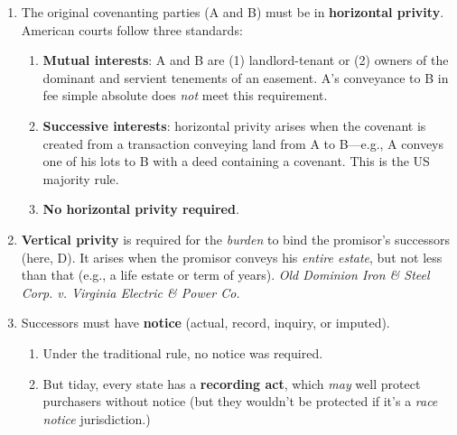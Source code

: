 \begin{enumerate}
\begin{enumerate}
        \item Covenants to pay dues to homeowner associations are almost 
        always enforced.\footnote{Casebook p. 874.}
        \item ``The touch and concern requirement has been criticized as being 
        vague and unpredictable, based upon obscure reasoning, and interfering 
        with the intent of the parties.''\footnote{Casebook p. 874.}
        \item The Restatement (Third) supersedes the touch and concern 
        requirement and assumes that covenants are valid unless it violates 
        public policy. It allows subsequent invalidity based on changed 
        circumstances.\footnote{Casebook pp. 874--75.}
    \end{enumerate}
    \item The original covenanting parties (A and B) must be in 
    \textbf{horizontal privity}. American courts follow three standards:
    \begin{enumerate}
        \item \textbf{Mutual interests}: A and B are (1) landlord-tenant or 
        (2) owners of the dominant and servient tenements of an easement. A's 
        conveyance to B in fee simple absolute does \emph{not} meet this 
        requirement.
        \item \textbf{Successive interests}: horizontal privity arises when 
        the covenant is created from a transaction conveying land from A to 
        B---e.g., A conveys one of his lots to B with a deed containing a 
        covenant. This is the US majority rule.
        \item \textbf{No horizontal privity required}.
    \end{enumerate}
    \item \textbf{Vertical privity} is required for the \emph{burden} to bind 
    the promisor's successors (here, D). It arises when the promisor conveys 
    his \emph{entire estate}, but not less than that (e.g., a life estate or 
    term of years). \emph{Old Dominion Iron \& Steel Corp. v. Virginia 
    Electric \& Power Co.}
    \item Successors must have \textbf{notice} (actual, record, inquiry, or 
    imputed).
    \begin{enumerate}
        \item  Under the traditional rule, no notice was required.
        \item But tiday, every state has a \textbf{recording act}, which 
        \emph{may} well protect purchasers without notice (but they wouldn't 
        be protected if it's a \emph{race notice} jurisdiction.)
    \end{enumerate}
\end{enumerate}

